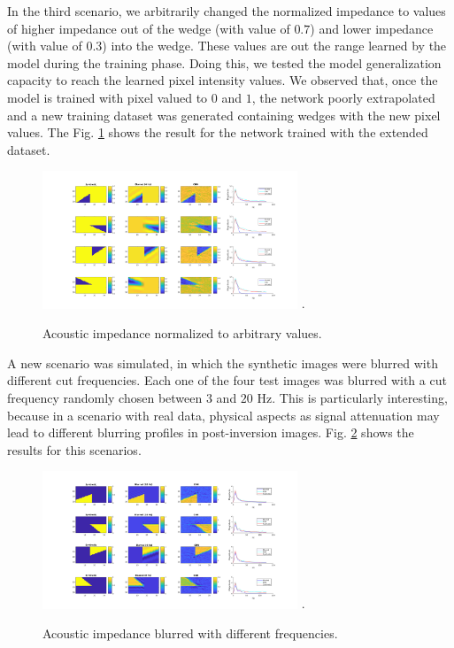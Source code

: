 \documentclass[conference,compsoc]{IEEEtran}
\begin{document}
In the third scenario, we arbitrarily changed the normalized impedance to values
of higher impedance out of the wedge (with value of $0.7$) and lower impedance (with value of $0.3$)
into the wedge. These values are out the range learned by the model during the training phase.
Doing this, we tested the model generalization capacity to reach the learned pixel intensity values.
We observed that, once the model is trained with pixel valued to $0$ and $1$, the network poorly
extrapolated and a new training dataset was generated containing wedges with the new pixel values.
The Fig. \ref{fig_scenario2} shows the result for the network trained with the extended dataset.
\begin{figure}[!t]
\centering
\includegraphics[width=3.0in]{Figs/Caso2}
\DeclareGraphicsExtensions.
\caption{Acoustic impedance normalized to arbitrary values.}
\label{fig_scenario2}
\end{figure}


A new scenario was simulated, in which the  synthetic images were blurred with different
cut frequencies. Each one of the four test images was blurred with a cut frequency
randomly chosen between $3$ and $20$ Hz. This is particularly interesting, because
in a scenario with real data, physical aspects as signal attenuation may lead to
different blurring profiles in post-inversion images.
Fig. \ref{fig_scenario5} shows the results for this scenarios.
\begin{figure}[!t]
\centering
\includegraphics[width=3.0in]{Figs/Caso5}
\DeclareGraphicsExtensions.
\caption{Acoustic impedance blurred with different frequencies.}
\label{fig_scenario5}
\end{figure}
\end{document}
